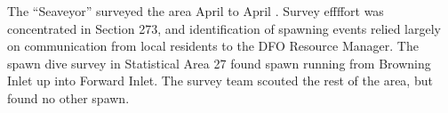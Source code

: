 The ``Seaveyor'' surveyed the area April  to April .
Survey effﬀort was concentrated in Section 273, and identification of spawning events relied largely on communication from local residents to the DFO Resource Manager.
The spawn dive survey in Statistical Area 27 found spawn running from Browning Inlet up into Forward Inlet.
The survey team scouted the rest of the area, but found no other spawn.  